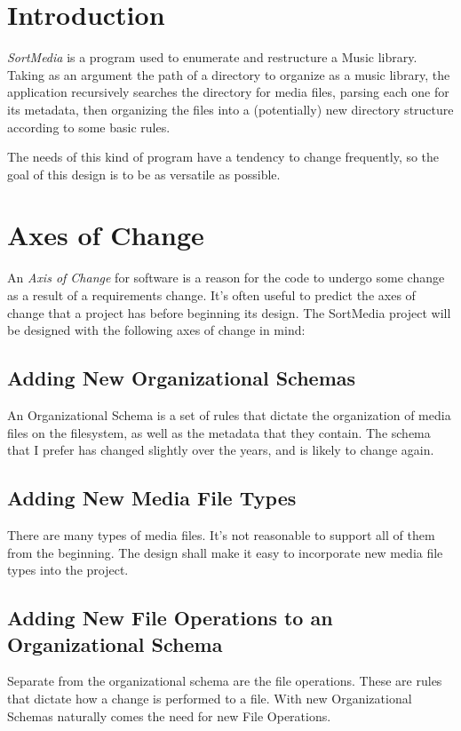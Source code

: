 \documentclass{designdoc}
\begin{document}
\section{Introduction}
\textit{SortMedia} is a program used to enumerate and restructure a Music
library. Taking as an argument the path of a directory to organize as a music
library, the application recursively searches the directory for media files,
parsing each one for its metadata, then organizing the files into a
(potentially) new directory structure according to some basic rules.

The needs of this kind of program have a tendency to change frequently, so the
goal of this design is to be as versatile as possible.

\hypertarget{sec:axesOfChange}{\section{Axes of Change}}
An \textit{Axis of Change} for software is a reason for the code to undergo
some change as a result of a requirements change. It's often useful to predict
the axes of change that a project has before beginning its design. The
SortMedia project will be designed with the following axes of change in mind:

\subsection{Adding New Organizational Schemas}
An Organizational Schema is a set of rules that dictate the organization of
media files on the filesystem, as well as the metadata that they contain. The
schema that I prefer has changed slightly over the years, and is likely to
change again.

\subsection{Adding New Media File Types}
There are many types of media files. It's not reasonable to support all of them
from the beginning. The design shall make it easy to incorporate new media file
types into the project.

\subsection{Adding New File Operations to an Organizational Schema}
Separate from the organizational schema are the file operations. These are
rules that dictate how a change is performed to a file. With new Organizational
Schemas naturally comes the need for new File Operations.
\end{document}
